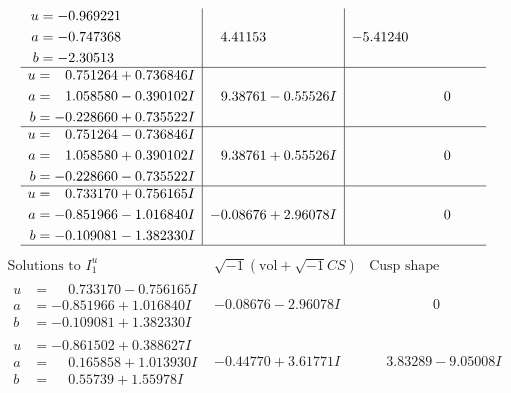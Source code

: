 \documentclass[1p]{elsarticle_modified}
\theoremstyle{definition}
\newcommand{\I}{\sqrt{-1}}
\begin{document}
$$\begin{array}{c|c|c}
\begin{aligned}
u &= -0.969221\phantom{ +0.000000I} \\
a &= -0.747368\phantom{ +0.000000I} \\
b &= -2.30513\phantom{ +0.000000I}\end{aligned}
 & \phantom{-}4.41153\phantom{ +0.000000I} & -5.41240\phantom{ +0.000000I} \\ \hline\begin{aligned}
u &= \phantom{-}0.751264 + 0.736846 I \\
a &= \phantom{-}1.058580 - 0.390102 I \\
b &= -0.228660 + 0.735522 I\end{aligned}
 & \phantom{-}9.38761 - 0.55526 I & \phantom{-0.000000 } 0 \\ \hline\begin{aligned}
u &= \phantom{-}0.751264 - 0.736846 I \\
a &= \phantom{-}1.058580 + 0.390102 I \\
b &= -0.228660 - 0.735522 I\end{aligned}
 & \phantom{-}9.38761 + 0.55526 I & \phantom{-0.000000 } 0 \\ \hline\begin{aligned}
u &= \phantom{-}0.733170 + 0.756165 I \\
a &= -0.851966 - 1.016840 I \\
b &= -0.109081 - 1.382330 I\end{aligned}
 & -0.08676 + 2.96078 I & \phantom{-0.000000 } 0\\
 \hline 
 \end{array}$$\newpage$$\begin{array}{c|c|c}  
\text{Solutions to }I^u_{1}& \I (\text{vol} + \sqrt{-1}CS) & \text{Cusp shape}\\
 \hline 
\begin{aligned}
u &= \phantom{-}0.733170 - 0.756165 I \\
a &= -0.851966 + 1.016840 I \\
b &= -0.109081 + 1.382330 I\end{aligned}
 & -0.08676 - 2.96078 I & \phantom{-0.000000 } 0 \\ \hline\begin{aligned}
u &= -0.861502 + 0.388627 I \\
a &= \phantom{-}0.165858 + 1.013930 I \\
b &= \phantom{-}0.55739 + 1.55978 I\end{aligned}
 & -0.44770 + 3.61771 I & \phantom{-}3.83289 - 9.05008 I \\ \hline\begin{aligned}

\end{aligned}
\end{array}$$
\end{document}

